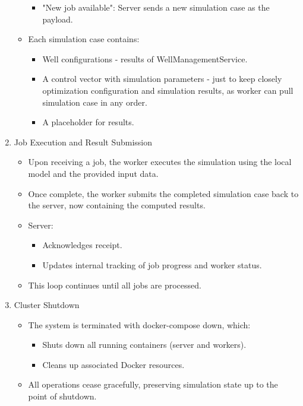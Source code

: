 \begin{enumerate}
\begin{itemize}
\begin{itemize}
			\item "New job available": Server sends a new simulation case as the payload.
		\end{itemize}
		\item Each simulation case contains:
		\begin{itemize}
			\item Well configurations - results of WellManagementService.
			\item A control vector with simulation parameters - just to keep closely optimization configuration and simulation results, as worker can pull simulation case in any order.
			\item A placeholder for results.
		\end{itemize}
	\end{itemize}
	\item Job Execution and Result Submission
	\begin{itemize}
		\item Upon receiving a job, the worker executes the simulation using the local model and the provided input data.
		\item Once complete, the worker submits the completed simulation case back to the server, now containing the computed results.
		\item Server:
		\begin{itemize}
			\item Acknowledges receipt.
			\item Updates internal tracking of job progress and worker status.
		\end{itemize}
		\item This loop continues until all jobs are processed.
	\end{itemize}
	\item Cluster Shutdown
	\begin{itemize}
		\item The system is terminated with docker-compose down, which:
		\begin{itemize}
			\item Shuts down all running containers (server and workers).
			\item Cleans up associated Docker resources.
		\end{itemize}
		\item All operations cease gracefully, preserving simulation state up to the point of shutdown.
	\end{itemize}
\end{enumerate}

